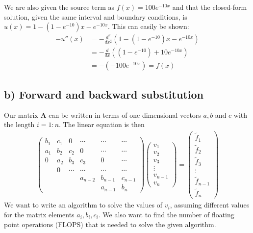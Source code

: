 \documentclass[12pt]{article}
\begin{document}
We are also given the source term as $f(x) = 100e^{-10x}$ and that the closed-form solution, given the same interval and boundary conditions, is $u(x) = 1 - \left(1-e^{-10} \right)x - e^{-10x}$. This can easily be shown:
\begin{align}
-u''(x) &= -\frac{d^2}{dx^2} \left( 1 - \left(1-e^{-10} \right) x - e^{-10x} \right) \nonumber \\
&= - \frac{d}{dx}\left((1-e^{-10}) + 10e^{-10x} \right) \nonumber\\
&= -\left(-100e^{-10x} \right) = f(x)
\end{align}
\subsection*{b) Forward and backward substitution}
Our matrix $\mathbf{A}$ can be written in terms of one-dimensional vectors $a,b$ and $c$ with the length $i=1:n$. The linear equation is then
\begin{align}
\begin{pmatrix}
b_1 & c_1 & 0 & \cdots & \cdots & \cdots \\
a_1 & b_2 & c_2 & 0 & \cdots & \cdots \\
0 & a_2 & b_3 & c_3 & 0 & \cdots \\
 & 0 & \cdots & \cdots & \cdots & \cdots \\
 & & & a_{n-2} & b_{n-1} & c_{n-1} \\
 & & & & a_{n-1} & b_n
\end{pmatrix}
\begin{pmatrix}
v_1 \\
v_2 \\
v_3 \\
\vdots \\
v_{n-1} \\
v_n
\end{pmatrix}
=
\begin{pmatrix}
\tilde{f}_1 \\
\tilde{f}_2 \\
\tilde{f}_3 \\
\vdots \\
\tilde{f}_{n-1} \\
\tilde{f}_n
\end{pmatrix}
\end{align}
We want to write an algorithm to solve the values of $v_i$, assuming different values for the matrix elements $a_i, b_i, c_i$. We also want to find the number of floating point operations (FLOPS) that is needed to solve the given algorithm.
\end{document}
